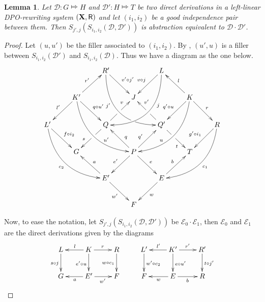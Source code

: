 \documentclass[a4paper]{article}
\def\R{\mathsf{R}}
\def\X{\textbf {\textup{X}}}
\newcommand{\dder}[1]{\mathscr{#1}}
\newtheorem{lemma}[theorem]{Lemma}
\theoremstyle{definition}
\begin{document}

\begin{lemma}\label{lem:rev}
	Let $\dder{D}\colon G\Mapsto H$ and $\dder{D}'\colon H\Mapsto T$ be two direct derivations in a left-linear DPO-rewriting system $(\X, \R)$ and let $(i_1,i_2)$ be a good independence pair between them. Then $S_{j',j}(S_{i_1,i_2}(\dder{D}, \dder{D'}))$ is abstraction equivalent to $\dder{D}\cdot \dder{D}'$. 
\end{lemma}
\begin{proof}Let $(u,u')$ be the filler associated to $(i_1, i_2)$. By , $(u', u)$ is a filler between $S_{i_1,i_2}(\dder{D}')$ and $S_{i_1,i_2}(\dder{D})$. Thus we have a diagram as the one below.
		\[\xymatrix{&&R' \ar@/_1cm/[ddrr]_(.35){j'}|(.7)\hole \ar[dr]^{v'\circ j'}&& L \ar@/^1cm/[ddll]^(.35){j}  \ar[dl]_{v\circ j}\\&K'\ar[dr]^{q\circ u'}\ar[dl]_{l'} \ar@/_.8cm/[ddrr]^(.65){u'}\ar[ur]^{r'}&& J && K \ar@/^.8cm/[ddll]_(.65){u}\ar[dl]_{q'\circ u}\ar[lu]_{l} \ar[dr]^{r}\\L' \ar[dr]^{f\circ i_2} \ar@/_.8cm/[ddrr]_{c_2}&& Q \ar[dl]|(.42)\hole_(.64){s}\ar[ur]|(.48)\hole^(.7){v}&&Q' \ar[dr]|(.42)\hole_(.65){t} \ar[ul]|(.48)\hole_(.7){v'}&&R\ar@/^.8cm/[ddll]^{c_1}\ar[dl]_{g'\circ i_1}\\&G &&P\ar[dr]^{e} \ar[dl]_{e'}\ar[ur]^(.4){q'}\ar[ul]_(.4){q}&&T\\&&E' \ar[ul]_{a}\ar[dr]_{w'} &&E\ar[ur]^{b} \ar[dl]^{w}\\&&&F}\]
	
	Now, to ease the notation, let $S_{j',j}(S_{i_1,i_2}(\dder{D}, \dder{D'}))$ be $\dder{E}_0\cdot \dder{E}_1$, then $\dder{E}_0$ and $\dder{E}_1$ are the direct derivations given by the diagrams
	\[\xymatrix{L \ar[d]_{s\circ j}& K\ar[l]_{l} \ar[r]^{r} \ar[d]_{e'\circ u} & R \ar[d]_{w\circ c_1} & L' \ar[d]^{w'\circ c_2}& K' \ar[d]^{e\circ u'} \ar[r]^{r'} \ar[l]_{l'}& R' \ar[d]^{t\circ j'}\\G & E' \ar[l]^{a}  \ar[r]_{w'}& F & F & E \ar[l]^{w} \ar[r]_{b} & R}\]
	

\end{proof}
\end{document}
